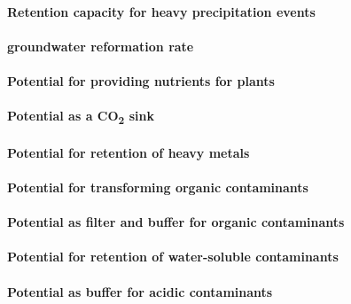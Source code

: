 \documentclass[preprint,12pt,authoryear]{elsarticle}
\begin{document}
\paragraph{Retention capacity for heavy precipitation events}
 
 
\paragraph{groundwater reformation rate}


\paragraph{Potential for providing nutrients for plants}

\paragraph{Potential as a CO\textsubscript{2} sink}

\paragraph{Potential for retention of heavy metals}

\paragraph{Potential for transforming organic contaminants}

\paragraph{Potential as filter and buffer for organic contaminants}

\paragraph{Potential for retention of water-soluble contaminants}

\paragraph{Potential as buffer for acidic contaminants}
\end{document}
